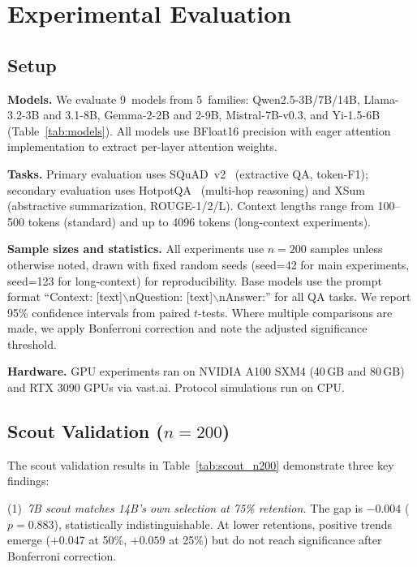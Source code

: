 \documentclass[journal]{IEEEtran}
\begin{document}
\section{Experimental Evaluation}
\label{sec:experiments}

\subsection{Setup}

\textbf{Models.}
We evaluate 9~models from 5~families: Qwen2.5-3B/7B/14B, Llama-3.2-3B and 3.1-8B, Gemma-2-2B and 2-9B, Mistral-7B-v0.3, and Yi-1.5-6B (Table~\ref{tab:models}).
All models use BFloat16 precision with eager attention implementation to extract per-layer attention weights.

\textbf{Tasks.}
Primary evaluation uses SQuAD~v2~\cite{squad} (extractive QA, token-F1); secondary evaluation uses HotpotQA~\cite{hotpotqa} (multi-hop reasoning) and XSum~\cite{xsum} (abstractive summarization, ROUGE-1/2/L).
Context lengths range from 100--500 tokens (standard) and up to 4096 tokens (long-context experiments).

\textbf{Sample sizes and statistics.}
All experiments use $n = 200$ samples unless otherwise noted, drawn with fixed random seeds (seed=42 for main experiments, seed=123 for long-context) for reproducibility.
Base models use the prompt format ``Context: [text]$\backslash$nQuestion: [text]$\backslash$nAnswer:'' for all QA tasks.
We report 95\% confidence intervals from paired $t$-tests.
Where multiple comparisons are made, we apply Bonferroni correction and note the adjusted significance threshold.

\textbf{Hardware.}
GPU experiments ran on NVIDIA A100 SXM4 (40\,GB and 80\,GB) and RTX 3090 GPUs via vast.ai.
Protocol simulations run on CPU.

\subsection{Scout Validation ($n = 200$)}

The scout validation results in Table~\ref{tab:scout_n200} demonstrate three key findings:

(1)~\emph{7B scout matches 14B's own selection at 75\% retention.}
The gap is $-0.004$ ($p = 0.883$), statistically indistinguishable.
At lower retentions, positive trends emerge ($+0.047$ at 50\%, $+0.059$ at 25\%) but do not reach significance after Bonferroni correction.
\end{document}
